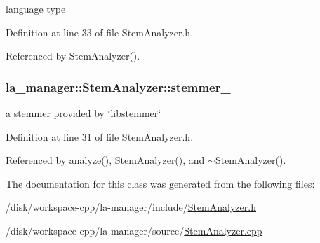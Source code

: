 language type 



Definition at line 33 of file StemAnalyzer.h.

Referenced by StemAnalyzer().\hypertarget{classla__manager_1_1StemAnalyzer_9b62790b49a8b011722029948483099a}{
\subsubsection[{stemmer\_\-}]{ {\bf la\_\-manager::StemAnalyzer::stemmer\_\-}}}
\label{classla__manager_1_1StemAnalyzer_9b62790b49a8b011722029948483099a}


a stemmer provided by \char`\"{}libstemmer\char`\"{} 



Definition at line 31 of file StemAnalyzer.h.

Referenced by analyze(), StemAnalyzer(), and $\sim$StemAnalyzer().

The documentation for this class was generated from the following files:\begin{CompactItemize}
\item 
/disk/workspace-cpp/la-manager/include/\hyperlink{StemAnalyzer_8h}{StemAnalyzer.h}\item 
/disk/workspace-cpp/la-manager/source/\hyperlink{StemAnalyzer_8cpp}{StemAnalyzer.cpp}\end{CompactItemize}
